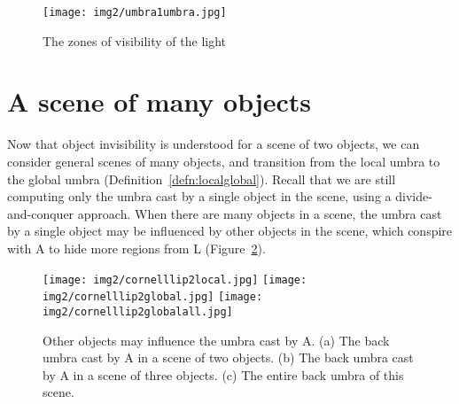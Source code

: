 \documentclass[9pt,twocolumn]{article}
\begin{document}
\begin{figure}
\begin{center}
\texttt{[image: img2/umbra1umbra.jpg]}
\end{center}
\caption{The zones of visibility of the light}
\label{fig:umbra2}
\end{figure}
\fi



\section{A scene of many objects}
\label{sec:scene}

Now that object invisibility is understood for a scene of two objects,
we can consider general scenes of many objects,
and transition from the local umbra to the global umbra
(Definition~\ref{defn:localglobal}).
Recall that we are still computing only the umbra cast by a single object in the scene, 
using a divide-and-conquer approach.
When there are many objects in a scene, 
the umbra cast by a single object may be influenced by other objects in the scene,
which conspire with A to hide more regions from L
(Figure~\ref{fig:globalcornelllip}).

\begin{figure}[h]
\begin{center}
\texttt{[image: img2/cornelllip2local.jpg]}
\texttt{[image: img2/cornelllip2global.jpg]}
\texttt{[image: img2/cornelllip2globalall.jpg]}
\end{center}
\caption{Other objects may influence the umbra cast by A.
  (a) The back umbra cast by A in a scene of two objects. 
  (b) The back umbra cast by A in a scene of three objects. 
  (c) The entire back umbra of this scene.}
\label{fig:globalcornelllip}
\end{figure}

\end{document}
